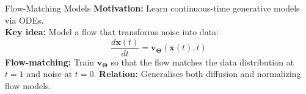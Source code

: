 \documentclass{beamer}
\def\vs1{\vspace{1mm}}
\newcommand{\bs}[1]{\boldsymbol{#1}}
\begin{document}
\begin{frame}{Flow-Matching Models}
\textbf{Motivation:} Learn continuous-time generative models via ODEs.\\
\vs1
\textbf{Key idea:} Model a flow that transforms noise into data:
\begin{equation}
  \frac{d\bs{x}(t)}{dt} = \bs{v}_{\bs{\Theta}}(\bs{x}(t), t)
\end{equation}
\vs1
\textbf{Flow-matching:} Train $\bs{v}_{\bs{\Theta}}$ so that the flow matches the data distribution at $t=1$ and noise at $t=0$.
\vs1
\textbf{Relation:} Generalises both diffusion and normalizing flow models.
\end{frame}
\end{document}
